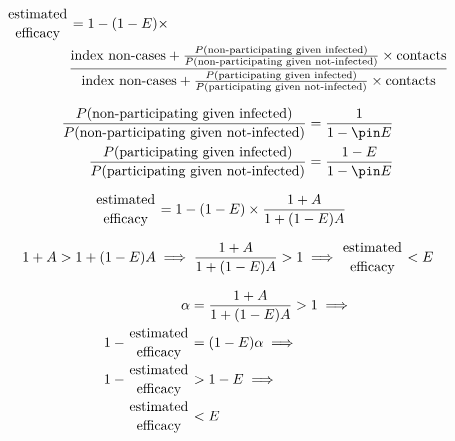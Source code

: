 \documentclass{article}
\begin{document}
\begin{equation*}\begin{aligned}
\genfrac{}{}{0pt}{}{\textrm{estimated}}{\textrm{efficacy}} &= 1 - (1-E)\times\\
&\frac{\textrm{index non-cases} + \frac{P(\textrm{non-participating given infected})}{P(\textrm{non-participating given not-infected})}\times\textrm{contacts}}{\textrm{index non-cases} + \frac{P(\textrm{participating given infected})}{P(\textrm{participating given not-infected})}\times\textrm{contacts}}
\end{aligned}\end{equation*}

\begin{equation*}\begin{aligned}
\frac{P(\textrm{non-participating given infected})}{P(\textrm{non-participating given not-infected})} &= \frac{1}{1-\pin E}\\
\frac{P(\textrm{participating given infected})}{P(\textrm{participating given not-infected})} &= \frac{1-E}{1-\pin E}
\end{aligned}\end{equation*}

\begin{equation*}\begin{aligned}
\genfrac{}{}{0pt}{}{\textrm{estimated}}{\textrm{efficacy}} &= 1 - (1-E)\times\frac{1 + A}{1 + (1-E)A}
\end{aligned}\end{equation*}

\begin{equation*}\begin{aligned}
1 + A > 1 + (1-E)A \implies \frac{1 + A}{1 + (1-E)A} > 1 \implies \genfrac{}{}{0pt}{}{\textrm{estimated}}{\textrm{efficacy}} < E
\end{aligned}\end{equation*}

\begin{equation*}\begin{aligned}
\alpha &= \frac{1 + A}{1 + (1-E)A} > 1 \implies\\ 1-\genfrac{}{}{0pt}{}{\textrm{estimated}}{\textrm{efficacy}} &= (1-E)\alpha \implies\\
1-\genfrac{}{}{0pt}{}{\textrm{estimated}}{\textrm{efficacy}} &> 1-E \implies\\
\genfrac{}{}{0pt}{}{\textrm{estimated}}{\textrm{efficacy}} &< E
\end{aligned}\end{equation*}
\end{document}
